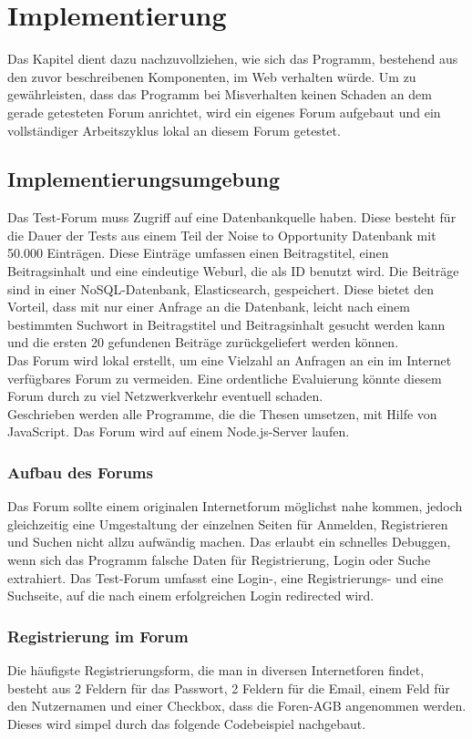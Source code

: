 \section{Implementierung}
Das Kapitel dient dazu nachzuvollziehen, wie sich das Programm, bestehend aus den zuvor beschreibenen Komponenten, im Web verhalten würde. Um zu gewährleisten, dass das Programm bei Misverhalten keinen Schaden an dem gerade getesteten Forum anrichtet, wird ein eigenes Forum aufgebaut und ein vollständiger Arbeitszyklus lokal an diesem Forum getestet.

\subsection{Implementierungsumgebung}
Das Test-Forum muss Zugriff auf eine Datenbankquelle haben. Diese besteht für die Dauer der Tests aus einem Teil der Noise to Opportunity Datenbank mit 50.000 Einträgen. Diese Einträge umfassen einen Beitragstitel, einen Beitragsinhalt und eine eindeutige Weburl, die als ID benutzt wird. Die Beiträge sind in einer NoSQL-Datenbank, Elasticsearch, gespeichert. Diese bietet den Vorteil, dass mit nur einer Anfrage an die Datenbank, leicht nach einem bestimmten Suchwort  in Beitragstitel und Beitragsinhalt gesucht werden kann und die ersten 20 gefundenen Beiträge zurückgeliefert werden können.\\
Das Forum wird lokal erstellt, um eine Vielzahl an Anfragen an ein im Internet verfügbares Forum zu vermeiden. Eine ordentliche Evaluierung könnte diesem Forum durch zu viel Netzwerkverkehr eventuell schaden.\\
Geschrieben werden alle Programme, die die Thesen umsetzen, mit Hilfe von JavaScript. Das Forum wird auf einem Node.js-Server laufen. 

\subsubsection{Aufbau des Forums}
Das Forum sollte einem originalen Internetforum möglichst nahe kommen, jedoch gleichzeitig eine Umgestaltung der einzelnen Seiten für Anmelden, Registrieren und Suchen nicht allzu aufwändig machen. Das erlaubt ein schnelles Debuggen, wenn sich das Programm falsche Daten für Registrierung, Login oder Suche extrahiert. Das Test-Forum umfasst eine Login-, eine Registrierungs- und eine Suchseite, auf die nach einem erfolgreichen Login redirected wird.

\subsubsection{Registrierung im Forum}
Die häufigste Registrierungsform, die man in diversen Internetforen findet, besteht aus 2 Feldern für das Passwort, 2 Feldern für die Email, einem Feld für den Nutzernamen und einer Checkbox, dass die Foren-AGB angenommen werden. Dieses wird simpel durch das folgende Codebeispiel nachgebaut.

